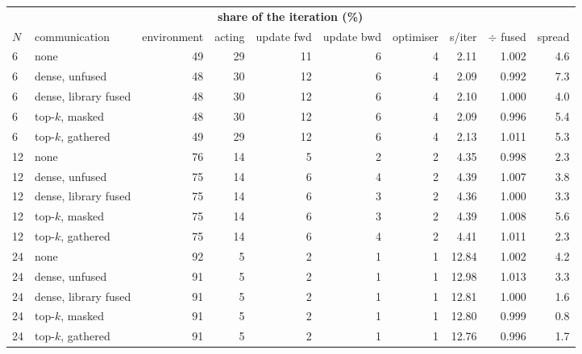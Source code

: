 \begin{tabular}{ll rrrrr rrr}
\toprule
& & \multicolumn{5}{c}{\textbf{share of the iteration (\%)}} & & & \\
\cmidrule(lr){3-7}
$N$ & communication & environment & acting & update fwd & update bwd & optimiser & s/iter & $\div$ fused & spread \\
\midrule
6 & none & 49 & 29 & 11 & 6 & 4 & 2.11 & 1.002 & 4.6 \\
6 & dense, unfused & 48 & 30 & 12 & 6 & 4 & 2.09 & 0.992 & 7.3 \\
6 & dense, library fused & 48 & 30 & 12 & 6 & 4 & 2.10 & 1.000 & 4.0 \\
6 & top-$k$, masked & 48 & 30 & 12 & 6 & 4 & 2.09 & 0.996 & 5.4 \\
6 & top-$k$, gathered & 49 & 29 & 12 & 6 & 4 & 2.13 & 1.011 & 5.3 \\
12 & none & 76 & 14 & 5 & 2 & 2 & 4.35 & 0.998 & 2.3 \\
12 & dense, unfused & 75 & 14 & 6 & 4 & 2 & 4.39 & 1.007 & 3.8 \\
12 & dense, library fused & 75 & 14 & 6 & 3 & 2 & 4.36 & 1.000 & 3.3 \\
12 & top-$k$, masked & 75 & 14 & 6 & 3 & 2 & 4.39 & 1.008 & 5.6 \\
12 & top-$k$, gathered & 75 & 14 & 6 & 4 & 2 & 4.41 & 1.011 & 2.3 \\
24 & none & 92 & 5 & 2 & 1 & 1 & 12.84 & 1.002 & 4.2 \\
24 & dense, unfused & 91 & 5 & 2 & 1 & 1 & 12.98 & 1.013 & 3.3 \\
24 & dense, library fused & 91 & 5 & 2 & 1 & 1 & 12.81 & 1.000 & 1.6 \\
24 & top-$k$, masked & 91 & 5 & 2 & 1 & 1 & 12.80 & 0.999 & 0.8 \\
24 & top-$k$, gathered & 91 & 5 & 2 & 1 & 1 & 12.76 & 0.996 & 1.7 \\
\bottomrule
\end{tabular}%
